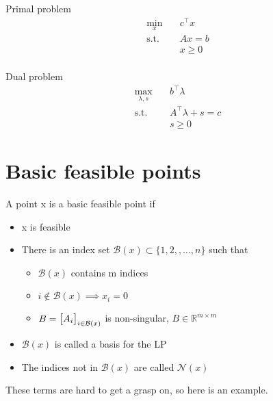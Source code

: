 \documentclass{article}
\begin{document}
\medskip
\begin{minipage}[c]{0.5\textwidth}
  \centering
  Primal problem
  \begin{align*}
    \min_{x} \quad    & c^{\top}x \\
    \text{s.t.} \quad & Ax = b    \\
                      & x \geq 0  \\
  \end{align*}
\end{minipage}
\begin{minipage}[c]{0.2\textwidth}
  \centering
  Dual problem
  \begin{align*}
    \max_{\lambda, s} \quad & b^{\top}\lambda         \\
    \text{s.t.} \quad       & A^{\top}\lambda + s = c \\
                            & s \geq 0
  \end{align*}
\end{minipage}

\section{Basic feasible points}

A point x is a basic feasible point if
\begin{itemize}
  \item x is feasible
  \item There is an index set $\mathcal{B}(x) \subset \{1,2,,\dots,n\}$ such that
        \begin{itemize}
          \item $\mathcal{B}(x)$ contains m indices
          \item $i \notin \mathcal{B}(x) \implies x_i = 0$
          \item $B = \begin{bmatrix} A_i \end{bmatrix}_{i\in \mathcal{B}(x)}$ is non-singular, $B\in\mathbb{R}^{m \times m}$
        \end{itemize}
  \item $\mathcal{B}(x)$ is called a basis for the LP
  \item The indices not in $\mathcal{B}(x)$ are called $\mathcal{N}(x)$
\end{itemize}

These terms are hard to get a grasp on, so here is an example.

\begin{center}
\end{center}
\end{document}

